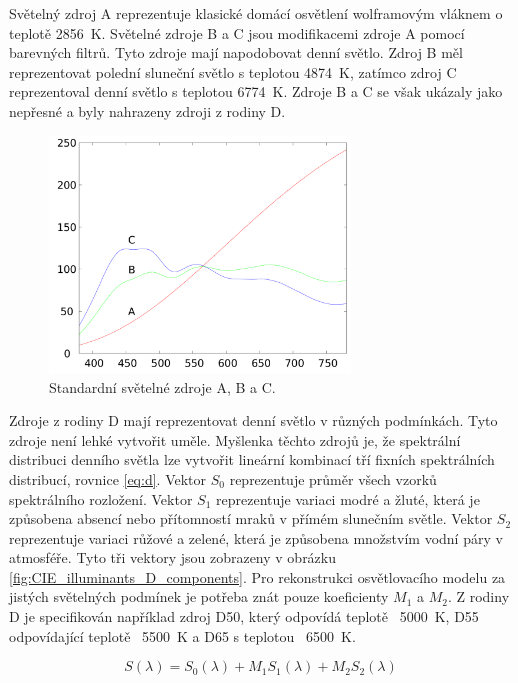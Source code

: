 \documentclass[a4paper, 12pt, titlepage]{article}
\begin{document}
  Světelný zdroj A reprezentuje klasické domácí osvětlení wolframovým vláknem o teplotě 2856~K.
  Světelné zdroje B a C jsou modifikacemi zdroje A pomocí barevných filtrů.
  Tyto zdroje mají napodobovat denní světlo.
  Zdroj B měl reprezentovat polední sluneční světlo s teplotou 4874~K, zatímco zdroj C reprezentoval denní světlo s teplotou 6774~K.
  Zdroje B a C se však ukázaly jako nepřesné a byly nahrazeny zdroji z rodiny D. \cite{stdilum}

  \begin{figure}[h!]
	\centering
	\includegraphics[width=8cm]{CIE_illuminants_A,B,C.pdf}
	\caption{Standardní světelné zdroje A, B a C.}
	\label{fig:CIE_illuminants_A,B,C}
	\end{figure}

  Zdroje z rodiny D mají reprezentovat denní světlo v různých podmínkách. Tyto zdroje není lehké vytvořit uměle.
  Myšlenka těchto zdrojů je, že spektrální distribuci denního světla lze vytvořit lineární kombinací tří fixních spektrálních distribucí, rovnice \ref{eq:d}.
  Vektor $S_0$ reprezentuje průměr všech vzorků spektrálního rozložení.
  Vektor $S_1$ reprezentuje variaci modré a žluté, která je způsobena absencí nebo přítomností mraků v přímém slunečním světle.
  Vektor $S_2$ reprezentuje variaci růžové a zelené, která je způsobena množstvím vodní páry v atmosféře.
  Tyto tři vektory jsou zobrazeny v obrázku \ref{fig:CIE_illuminants_D_components}.
  Pro rekonstrukci osvětlovacího modelu za jistých světelných podmínek je potřeba znát pouze koeficienty $M_1$ a $M_2$.
  Z rodiny D je specifikován například zdroj D50, který odpovídá teplotě ~5000~K, D55 odpovídající teplotě ~5500~K a D65 s teplotou ~6500~K.  \cite{Walker1996, stdilum}

  \begin{equation}
    S(\lambda) = S_0(\lambda) + M_1S_1(\lambda) + M_2S_2(\lambda)
    \label{eq:d}
  \end{equation}
\end{document}
